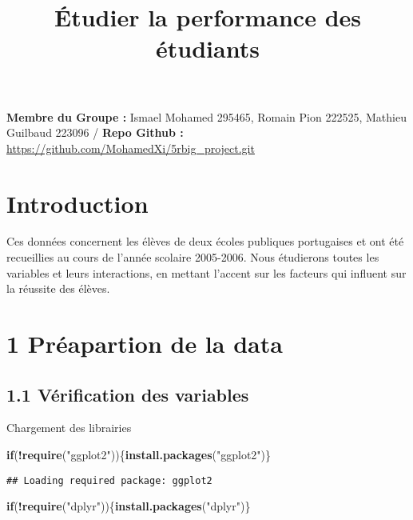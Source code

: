 \documentclass[
]{article}
\title{Étudier la performance des étudiants}
\author{}
\date{\vspace{-2.5em}}
\newenvironment{Shaded}{\begin{snugshade}}{\end{snugshade}}
\newcommand{\ControlFlowTok}[1]{\textcolor[rgb]{0.13,0.29,0.53}{\textbf{#1}}}
\newcommand{\KeywordTok}[1]{\textcolor[rgb]{0.13,0.29,0.53}{\textbf{#1}}}
\newcommand{\NormalTok}[1]{#1}
\newcommand{\OperatorTok}[1]{\textcolor[rgb]{0.81,0.36,0.00}{\textbf{#1}}}
\newcommand{\StringTok}[1]{\textcolor[rgb]{0.31,0.60,0.02}{#1}}
\begin{document}
\maketitle

\textbf{Membre du Groupe :} Ismael Mohamed 295465, Romain Pion 222525,
Mathieu Guilbaud 223096 / \textbf{Repo Github : }
\url{https://github.com/MohamedXi/5rbig_project.git}

\hypertarget{introduction}{%
\section{Introduction}\label{introduction}}

Ces données concernent les élèves de deux écoles publiques portugaises
et ont été recueillies au cours de l'année scolaire 2005-2006. Nous
étudierons toutes les variables et leurs interactions, en mettant
l'accent sur les facteurs qui influent sur la réussite des élèves.

\hypertarget{pruxe9apartion-de-la-data}{%
\section{1 Préapartion de la data}\label{pruxe9apartion-de-la-data}}

\hypertarget{vuxe9rification-des-variables}{%
\subsection{1.1 Vérification des
variables}\label{vuxe9rification-des-variables}}

Chargement des librairies

\begin{Shaded}
\begin{Highlighting}[]
\ControlFlowTok{if}\NormalTok{(}\OperatorTok{!}\KeywordTok{require}\NormalTok{(}\StringTok{"ggplot2"}\NormalTok{))\{}\KeywordTok{install.packages}\NormalTok{(}\StringTok{"ggplot2"}\NormalTok{)\}}
\end{Highlighting}
\end{Shaded}

\begin{verbatim}
## Loading required package: ggplot2
\end{verbatim}

\begin{Shaded}
\begin{Highlighting}[]
\ControlFlowTok{if}\NormalTok{(}\OperatorTok{!}\KeywordTok{require}\NormalTok{(}\StringTok{"dplyr"}\NormalTok{))\{}\KeywordTok{install.packages}\NormalTok{(}\StringTok{"dplyr"}\NormalTok{)\}}
\end{Highlighting}
\end{Shaded}
\end{document}
